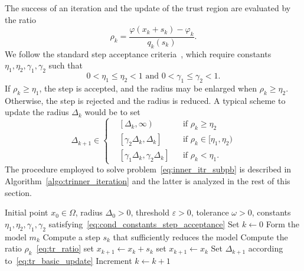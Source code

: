 \documentclass{article}
\numberwithin{equation}{section}
\theoremstyle{plain}
\begin{document}
The success of an iteration and the update of the trust region are evaluated by the ratio
\begin{equation}\label{eq:tr_ratio}
	\rho_k = \dfrac{\varphi(x_k+s_k)-\varphi_k}{q_k(s_k)}.
\end{equation}
We follow the standard step acceptance criteria~\cite{conn-etal:2000}, which require constants $\eta_1, \eta_2, \gamma_1, \gamma_2$ such that 
\begin{equation}\label{eq:cond_constants_step_acceptance}
	0< \eta_1 \le \eta_2 < 1 \text{ and } 0< \gamma_1 \le \gamma_2 < 1.
\end{equation}
If $\rho_k \ge \eta_1$, the step is accepted, and the radius may be enlarged when $\rho_k \ge \eta_2$. Otherwise, the step is rejected and the radius is reduced. A typical scheme to update the radius $\Delta_k$ would be to set
\begin{equation}\label{eq:tr_basic_update}
	\Delta_{k+1} \in \left\{\begin{aligned}
		& \left[\Delta_k,\infty\right) & &\text{if } \rho_k \ge \eta_2 \\
		& \left[\gamma_2\Delta_k, \Delta_k\right]  & &\text{if } \rho_k \in [\eta_1,\eta_2) \\
		& \left[\gamma_1\Delta_k, \gamma_2\Delta_k\right]  & &\text{if }  \rho_k<\eta_1.
	\end{aligned}\right.
\end{equation}
The procedure employed to solve problem~\eqref{eq:inner_itr_subpb} is described in Algorithm~\ref{algo:trinner_iteration} and the latter is analyzed in the rest of this section. 
\begin{algorithm}
	\caption{Trust-region inner iteration algorithm}
	\label{algo:trinner_iteration}
	\begin{algorithmic}[1]
		\Require Initial point $x_0 \in \Omega$, radius $\Delta_0 >0$, threshold $\varepsilon > 0$, tolerance $\omega > 0$, constants $\eta_1, \eta_2, \gamma_1, \gamma_2$ satisfying~\eqref{eq:cond_constants_step_acceptance}
		\State Set $k \gets 0$ 
		\Repeat{}
		\State Form the model $m_k$
		\State Compute a step $s_k$ that sufficiently reduces the model
		\State Compute the ratio $\rho_k$~\eqref{eq:tr_ratio}
		 set $x_{k+1}\gets x_k+s_k$ 
		\Else{} set $x_{k+1} \gets x_k$ \EndIf
		\State Set $\Delta_{k+1}$ according to~\eqref{eq:tr_basic_update}
		\State Increment $k\gets k+1$
	\end{algorithmic}
\end{algorithm}
\end{document}
